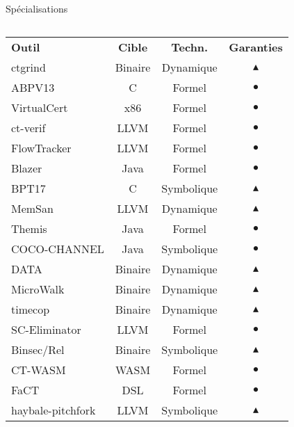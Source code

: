\documentclass{backend/backend}
\begin{document}
\begin{frame}{Spécialisations}
    \begin{columns}%
    \tiny
    \begin{tabular}{lccc}
        \toprule
        \textbf{Outil} & \textbf{Cible} & \textbf{Techn.} & \textbf{Garanties} \\
        \rowcolor{lightgray}
        ctgrind \cite{ctgrind} & Binaire & Dynamique & $\blacktriangle$ \\
        ABPV13 \cite{ABPV13} & C & Formel & $\bullet$ \\
        \rowcolor{lightgray}
        VirtualCert \cite{VirtualCert} & x86 & Formel & $\bullet$ \\
        ct-verif \cite{ctverif} & LLVM & Formel & $\bullet$ \\
        \rowcolor{lightgray}
        FlowTracker \cite{FlowTracker} & LLVM & Formel & $\bullet$ \\
        Blazer \cite{Blazer} & Java & Formel & $\bullet$ \\
        \rowcolor{lightgray}
        BPT17 \cite{BPT17} & C & Symbolique & $\blacktriangle$ \\
        MemSan \cite{MemSan} & LLVM & Dynamique & $\blacktriangle$ \\
        \rowcolor{lightgray}
        Themis \cite{Themis} & Java & Formel & $\bullet$ \\
        COCO-CHANNEL \cite{COCOCHANNEL} & Java & Symbolique & $\bullet$ \\
        \rowcolor{lightgray}
        DATA \cite{DATA1,DATA2} & Binaire & Dynamique & $\blacktriangle$ \\
        MicroWalk \cite{MicroWalk} & Binaire & Dynamique & $\blacktriangle$ \\
        \rowcolor{lightgray}
        timecop \cite{timecop} & Binaire & Dynamique & $\blacktriangle$ \\
        SC-Eliminator \cite{SCEliminator} & LLVM & Formel & $\bullet$ \\
        \rowcolor{lightgray}
        Binsec/Rel \cite{binsecRel2019} & Binaire & Symbolique & $\blacktriangle$ \\
        CT-WASM \cite{CTWASM} & WASM & Formel & $\bullet$ \\
        \rowcolor{lightgray}
        FaCT \cite{FaCT} & DSL & Formel & $\bullet$ \\
        haybale-pitchfork \cite{haybale-pitchfork} & LLVM & Symbolique & $\blacktriangle$ \\
        \bottomrule
    \end{tabular}


\end{columns}
\end{frame}
\end{document}
